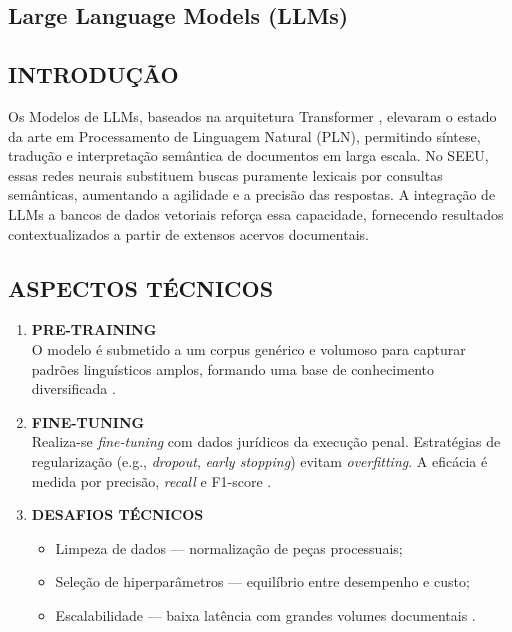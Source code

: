 \begin{description}
\section{Large Language Models (LLMs)}
\label{sec:llm}

\subsection*{INTRODUÇÃO}
Os Modelos de LLMs, baseados na arquitetura
Transformer \cite{vaswani2017attention,naveeda2024comprehensive}, elevaram o
estado da arte em Processamento de Linguagem Natural (PLN), permitindo síntese,
tradução e interpretação semântica de documentos em larga escala. No SEEU, essas redes neurais substituem buscas
puramente lexicais por consultas semânticas, aumentando a agilidade e a
precisão das respostas. A integração de LLMs a bancos de dados vetoriais
\cite{taipalus2024vector,qwak2024integrating} reforça essa capacidade,
fornecendo resultados contextualizados a partir de extensos acervos
documentais.

\subsection*{ASPECTOS TÉCNICOS}
\begin{enumerate}[label=\textbf{2.\arabic*}, leftmargin=*]
  \item \textbf{PRE-TRAINING}\label{itm:pretraining}\\
        O modelo é submetido a um corpus genérico e volumoso para capturar
        padrões linguísticos amplos, formando uma base de conhecimento
        diversificada \cite{naveeda2024comprehensive}.
  
  \item \textbf{FINE-TUNING}\label{itm:finetuning}\\
        Realiza-se \emph{fine-tuning} com dados jurídicos da execução penal.
        Estratégias de regularização (e.g., \textit{dropout}, \textit{early
        stopping}) evitam \textit{overfitting}. A eficácia é medida por
        precisão, \textit{recall} e F1-score
        \cite{yue2023disclawllm,lai2023lawm}.
  
  \item \textbf{DESAFIOS TÉCNICOS}\label{itm:desafios}\\[-0.8em]
        \begin{itemize}
          \item Limpeza de dados — normalização de peças processuais;
          \item Seleção de hiperparâmetros — equilíbrio entre desempenho e custo;
          \item Escalabilidade — baixa latência com grandes volumes documentais
                \cite{edwards2024hybrid,pujiono2024implementing,aquino2024extracting}.
        \end{itemize}
  

\end{enumerate}
\end{description}
